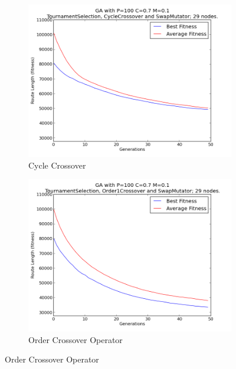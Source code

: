 \documentclass[10pt, a4paper]{article}
\begin{document}
\begin{figure}[h]
\centering
\begin{subfigure}[b]{0.67\textwidth}
\includegraphics[width=\textwidth]{img/results/cyclecrossover/swapmutator/n29p100c07m01}
\caption{Cycle Crossover}
\end{subfigure}

\begin{subfigure}[b]{0.67\textwidth}
\includegraphics[width=\textwidth]{img/results/order1crossover/swapmutator/n29p100c07m01}
\caption{Order Crossover Operator}
\end{subfigure}


\end{figure}
\end{document}
